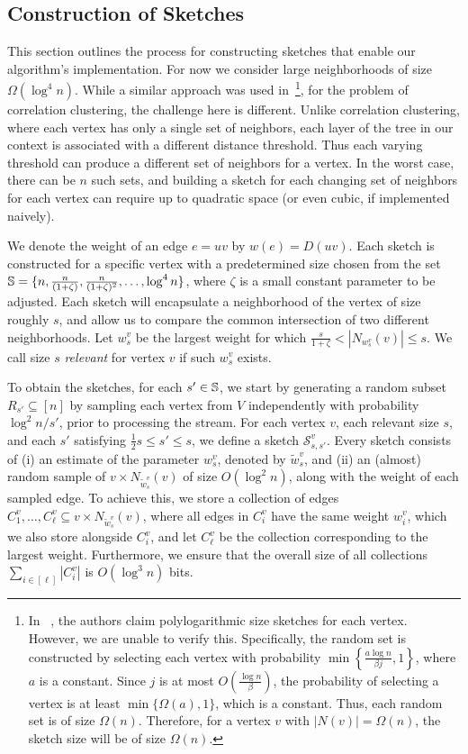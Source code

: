 \documentclass{article}
\newcommand{\Sk}{{\mathcal{S}}}
\begin{document}
\subsection{Construction of Sketches}\label{section:sketches}
This section outlines the process for constructing sketches that enable our algorithm's implementation. For now we consider large neighborhoods of size $\Omega (\log^4 n)$. 
While a similar approach was used in~\cite{cohen2021correlation}\footnote{In ~\cite{cohen2021correlation}, the authors claim polylogarithmic size sketches for each vertex. However, we are unable to verify this. Specifically, the random set is constructed by selecting each vertex with probability \(\min\left\{\frac{a \log n}{\beta j}, 1\right\}\), where \(a\) is a constant. Since \(j\) is at most \(O\left(\frac{\log n}{\beta}\right)\), the probability of selecting a vertex is at least \(\min\{\Omega(a), 1\}\), which is a constant. Thus, each random set is of size \(\Omega(n)\). Therefore, for a vertex \(v\) with \(|N(v)|=\Omega(n)\), the sketch size will be of size \(\Omega(n)\).}, for the problem of correlation clustering, the challenge here is different. Unlike correlation clustering, where each vertex has only a single set of neighbors, each layer of the tree in our context is associated with a different distance threshold. Thus each varying threshold can produce a different set of neighbors for a vertex. In the worst case, there can be \(n\) such sets, and building a sketch for each changing set of neighbors for each vertex can require up to quadratic space (or even cubic, if implemented naively).

We denote the weight of an edge $e=uv$ by $w(e)=D(uv)$.
Each sketch is constructed for a specific vertex with a predetermined size chosen from the set $\mathbb{S} = \{n, \frac{n}{(1+\zeta)}, \frac{n}{(1+\zeta)^2}, \dots, \log^4 n\}$, where $\zeta$ is a small constant parameter to be adjusted.
Each sketch will encapsulate a neighborhood of the vertex of size roughly $s$, and allow us to compare the common intersection of two different neighborhoods. 
Let \(w^v_s\) be the largest weight for which \(\frac{s}{1+\zeta}<|N_{w^v_s}(v)| \le s\). We call size \(s\) \emph{relevant} for vertex $v$ if such \(w^v_s\) exists.

To obtain the sketches, for each $s' \in \mathbb{S}$, we start by generating a random subset \(R_{s'} \subseteq [n]\) by sampling each vertex from $V$ independently with probability $\log^2 n/s'$, prior to processing the stream. 
For each vertex $v$, each relevant size $s$, and each $s'$ satisfying $\frac{1}{2}s \leq s' \leq s$, we define a sketch \(\Sk^{v}_{s,s'}\). 
Every sketch consists of (i) an estimate of the parameter \(w^v_s\), denoted by \(\tilde{w}^v_s\), and (ii) an (almost) random sample of \(v\times N_{\tilde{w}^v_s}(v) \) of size \(O(\log^2 n)\), along with the weight of each sampled edge. To achieve this, we store a collection of edges \(C_1^v, \dots, C_\ell^v \subseteq v\times N_{\tilde{w}^v_s}(v)\), where all edges in \(C_i^v\) have the same weight $w^v_i$, which we also store alongside \(C_i^v\), and let $C_\ell^v$ be the collection corresponding to the largest weight. Furthermore, we ensure that the overall size of all collections \(\sum_{i \in [\ell]} |C_i^v|\) is  \(O(\log^3 n)\) bits.
\end{document}

